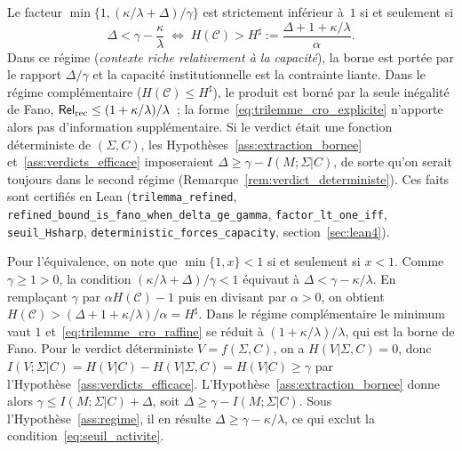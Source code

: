 \begin{sloppypar}
\begin{remark}
\label{rem:activite_delta}
Le facteur $\min\{1,(\kappa/\lambda+\Delta)/\gamma\}$ est strictement
inf\'erieur \`a~$1$ si et seulement si
\begin{equation}
\Delta < \gamma - \frac{\kappa}{\lambda}
\;\Longleftrightarrow\;
H(\mathcal{C}) > H^\sharp := \frac{\Delta + 1 + \kappa/\lambda}{\alpha}.
\label{eq:seuil_activite}
\end{equation}
Dans ce r\'egime (\emph{contexte riche relativement \`a la capacit\'e}), la
borne est port\'ee par le rapport $\Delta/\gamma$ et la capacit\'e
institutionnelle est la contrainte liante. Dans le r\'egime compl\'ementaire
($H(\mathcal{C}) \leq H^\sharp$), le produit est born\'e par la seule
in\'egalit\'e de Fano, $\mathsf{Rel}_{\mathrm{rec}} \leq (1+\kappa/\lambda)/\lambda$~; la
forme~\eqref{eq:trilemme_cro_explicite} n'apporte alors pas d'information
suppl\'ementaire. Si le verdict \'etait une fonction d\'eterministe de
$(\Sigma,C)$, les Hypoth\`eses~\ref{ass:extraction_bornee}
et~\ref{ass:verdicts_efficace} imposeraient $\Delta \geq \gamma - I(M;\Sigma|C)$,
de sorte qu'on serait toujours dans le second r\'egime
(Remarque~\ref{rem:verdict_deterministe}). Ces faits sont certifi\'es
en Lean (\texttt{trilemma\_refined}, \texttt{refined\_bound\_is\_fano\_when\_delta\_ge\_gamma},
\texttt{factor\_lt\_one\_iff}, \texttt{seuil\_Hsharp},
\texttt{deterministic\_forces\_capacity}, section~\ref{sec:lean4}).
\end{remark}

\begin{Preuve}
Pour l'\'equivalence, on note que $\min\{1,x\} < 1$ si et seulement si $x < 1$.
Comme $\gamma \geq 1 > 0$, la condition $(\kappa/\lambda+\Delta)/\gamma < 1$
\'equivaut \`a $\Delta < \gamma - \kappa/\lambda$. En rempla\c{c}ant $\gamma$ par
$\alpha H(\mathcal{C}) - 1$ puis en divisant par $\alpha > 0$, on obtient
$H(\mathcal{C}) > (\Delta + 1 + \kappa/\lambda)/\alpha = H^\sharp$. Dans le r\'egime
compl\'ementaire le minimum vaut $1$ et~\eqref{eq:trilemme_cro_raffine} se r\'eduit
\`a $(1+\kappa/\lambda)/\lambda$, qui est la borne de Fano. Pour le verdict
d\'eterministe $V = f(\Sigma, C)$, on a $H(V|\Sigma,C) = 0$, donc
$I(V;\Sigma|C) = H(V|C) - H(V|\Sigma,C) = H(V|C) \geq \gamma$ par
l'Hypoth\`ese~\ref{ass:verdicts_efficace}. L'Hypoth\`ese~\ref{ass:extraction_bornee}
donne alors $\gamma \leq I(M;\Sigma|C) + \Delta$, soit
$\Delta \geq \gamma - I(M;\Sigma|C)$. Sous l'Hypoth\`ese~\ref{ass:regime}, il en
r\'esulte $\Delta \geq \gamma - \kappa/\lambda$, ce qui exclut la
condition~\eqref{eq:seuil_activite}.
\end{Preuve}


\end{sloppypar}
